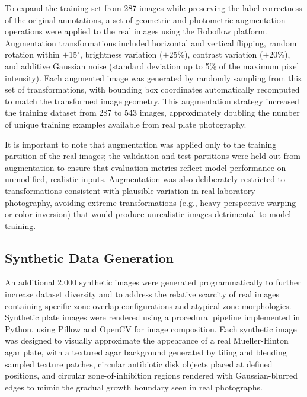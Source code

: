To expand the training set from 287 images while preserving the label correctness of the
original annotations, a set of geometric and photometric augmentation operations were applied
to the real images using the Roboflow platform. Augmentation transformations included
horizontal and vertical flipping, random rotation within $\pm$15$^\circ$, brightness variation
($\pm$25\%), contrast variation ($\pm$20\%), and additive Gaussian noise (standard deviation
up to 5\% of the maximum pixel intensity). Each augmented image was generated by randomly
sampling from this set of transformations, with bounding box coordinates automatically
recomputed to match the transformed image geometry. This augmentation strategy increased the
training dataset from 287 to 543 images, approximately doubling the number of unique training
examples available from real plate photography.

It is important to note that augmentation was applied only to the training partition of the
real images; the validation and test partitions were held out from augmentation to ensure
that evaluation metrics reflect model performance on unmodified, realistic inputs.
Augmentation was also deliberately restricted to transformations consistent with plausible
variation in real laboratory photography, avoiding extreme transformations (e.g., heavy
perspective warping or color inversion) that would produce unrealistic images detrimental to
model training.

\subsection{Synthetic Data Generation}

An additional 2,000 synthetic images were generated programmatically to further increase
dataset diversity and to address the relative scarcity of real images containing specific
zone overlap configurations and atypical zone morphologies. Synthetic plate images were
rendered using a procedural pipeline implemented in Python, using Pillow and OpenCV for
image composition. Each synthetic image was designed to visually approximate the appearance
of a real Mueller-Hinton agar plate, with a textured agar background generated by tiling and
blending sampled texture patches, circular antibiotic disk objects placed at defined positions,
and circular zone-of-inhibition regions rendered with Gaussian-blurred edges to mimic the
gradual growth boundary seen in real photographs.

